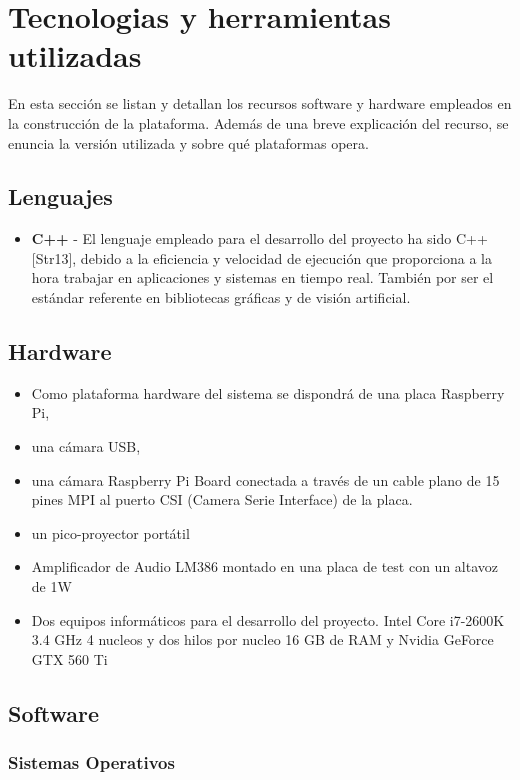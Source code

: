 \section{Tecnologias y herramientas utilizadas}

En esta sección se listan y detallan los recursos software y hardware empleados en la construcción de la plataforma. Además de una breve explicación del recurso, se enuncia la versión utilizada y sobre qué plataformas opera.

\subsection{Lenguajes}
\begin{itemize}
\item \textbf{C++} - El lenguaje empleado para el desarrollo del proyecto ha sido C++ [Str13], debido a la eficiencia y velocidad de ejecución que proporciona a la hora trabajar en aplicaciones y sistemas en tiempo real. También por ser el estándar referente en bibliotecas gráficas y de visión artificial.
\end{itemize}

\subsection{Hardware}
\begin{itemize}
\item Como plataforma hardware del sistema se dispondrá de una placa Raspberry Pi, 
\item una cámara USB, 
\item una cámara Raspberry Pi Board conectada a través de un cable plano de 15 pines MPI al puerto CSI (Camera Serie Interface) de la placa.
\item un pico-proyector portátil 
\item Amplificador de Audio LM386 montado en una placa de test con un altavoz de 1W
\item Dos equipos informáticos para el desarrollo del proyecto. Intel Core i7-2600K 3.4 GHz 4 nucleos y dos hilos por nucleo 16 GB de RAM y Nvidia GeForce GTX 560 Ti

\end{itemize}

\subsection{Software}
\subsubsection{Sistemas Operativos}

